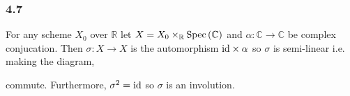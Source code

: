 \documentclass[12pt]{article}
\begin{document}
\subsubsection{4.7}

\newcommand{\R}{\mathbb{R}}
\renewcommand{\C}{\mathbb{C}}

For any scheme $X_0$ over $\R$ let $X = X_0 \times_\R \Spec{\C}$ and $\alpha : \C \to \C$ be complex conjucation. Then $\sigma : X \to X$ is the automorphism $\mathrm{id} \times \alpha$ so $\sigma$ is semi-linear i.e. making the diagram,
\begin{center}
\end{center}
commute. Furthermore, $\sigma^2 = \mathrm{id}$ so $\sigma$ is an involution.
\end{document}
